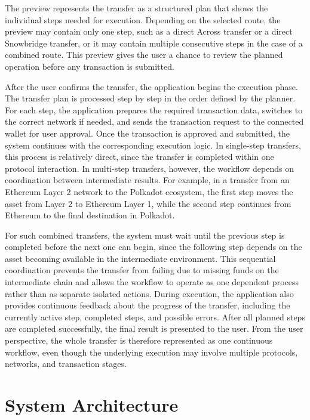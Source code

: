 \documentclass[conference]{IEEEtran}
\begin{document}
The preview represents the transfer as a structured plan that shows the individual steps needed for execution. Depending on the selected route, the preview may contain only one step, such as a direct Across transfer or a direct Snowbridge transfer, or it may contain multiple consecutive steps in the case of a combined route. This preview gives the user a chance to review the planned operation before any transaction is submitted.

After the user confirms the transfer, the application begins the execution phase. The transfer plan is processed step by step in the order defined by the planner. For each step, the application prepares the required transaction data, switches to the correct network if needed, and sends the transaction request to the connected wallet for user approval. Once the transaction is approved and submitted, the system continues with the corresponding execution logic. In single-step transfers, this process is relatively direct, since the transfer is completed within one protocol interaction. In multi-step transfers, however, the workflow depends on coordination between intermediate results. For example, in a transfer from an Ethereum Layer 2 network to the Polkadot ecosystem, the first step moves the asset from Layer 2 to Ethereum Layer 1, while the second step continues from Ethereum to the final destination in Polkadot.

For such combined transfers, the system must wait until the previous step is completed before the next one can begin, since the following step depends on the asset becoming available in the intermediate environment. This sequential coordination prevents the transfer from failing due to missing funds on the intermediate chain and allows the workflow to operate as one dependent process rather than as separate isolated actions. During execution, the application also provides continuous feedback about the progress of the transfer, including the currently active step, completed steps, and possible errors. After all planned steps are completed successfully, the final result is presented to the user. From the user perspective, the whole transfer is therefore represented as one continuous workflow, even though the underlying execution may involve multiple protocols, networks, and transaction stages.




\section{System Architecture}
\end{document}
